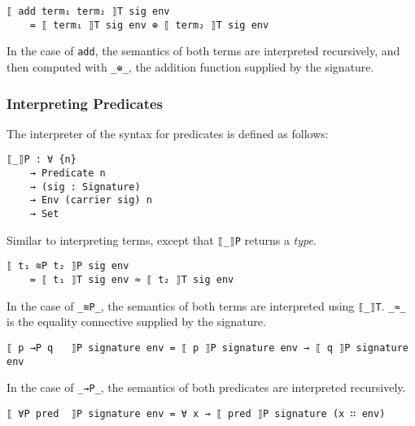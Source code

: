 \documentclass[\main/thesis.tex]{subfiles}
\begin{document}
\begin{lstlisting}
⟦ add term₁ term₂ ⟧T sig env
    = ⟦ term₁ ⟧T sig env ⊕ ⟦ term₂ ⟧T sig env
\end{lstlisting}

In the case of \lstinline|add|,
the semantics of both terms are interpreted recursively,
and then computed with \lstinline|_⊕_|,
the addition function supplied by the signature.

\subsubsection{Interpreting Predicates}

The interpreter of the syntax for predicates is defined as follows:

\begin{lstlisting}
⟦_⟧P : ∀ {n}
    → Predicate n
    → (sig : Signature)
    → Env (carrier sig) n
    → Set
\end{lstlisting}

Similar to interpreting terms, except that \lstinline|⟦_⟧P| returns a \textit{type}.

\begin{lstlisting}
⟦ t₁ ≋P t₂ ⟧P sig env
    = ⟦ t₁ ⟧T sig env ≈ ⟦ t₂ ⟧T sig env
\end{lstlisting}

In the case of \lstinline|_≋P_|,
the semantics of both terms are interpreted using \lstinline|⟦_⟧T|.
\lstinline|_≈_| is the equality connective supplied by the signature.


\begin{lstlisting}
⟦ p →P q   ⟧P signature env = ⟦ p ⟧P signature env → ⟦ q ⟧P signature env
\end{lstlisting}

In the case of \lstinline|_→P_|,
the semantics of both predicates are interpreted recursively.

\begin{lstlisting}
⟦ ∀P pred  ⟧P signature env = ∀ x → ⟦ pred ⟧P signature (x ∷ env)
\end{lstlisting}


%
\end{document}
